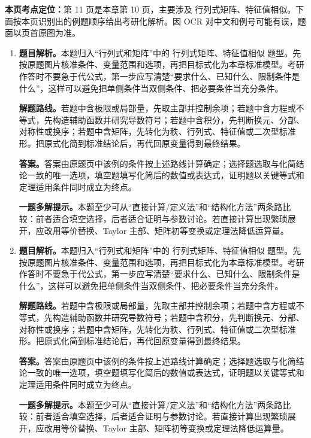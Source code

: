 \begin{solutionblock}
\textbf{本页考点定位：}第 11 页是本章第 10 页，主要涉及 行列式矩阵、特征值相似。下面按本页识别出的例题顺序给出考研化解析。因 OCR 对中文和例号可能有误，题面以页首原图为准。

\begin{enumerate}[label=\textbf{例\arabic*.}, leftmargin=2.4em]

\item \textbf{题目解析。}本题归入“行列式和矩阵”中的 行列式矩阵、特征值相似 题型。先按原题图片核准条件、变量范围和选项，再把目标式化为本章标准模型。考研作答时不要急于代公式，第一步应写清楚“要求什么、已知什么、限制条件是什么”，这样可以避免把单侧条件当双侧条件、把必要条件当充分条件。

\textbf{解题路线。}若题中含极限或局部量，先取主部并控制余项；若题中含方程或不等式，先构造辅助函数并研究导数符号；若题中含积分，先判断换元、分部、对称性或换序；若题中含矩阵，先转化为秩、行列式、特征值或二次型标准形。把原式化简到标准结论后，再代回原变量得到最终结果。

\textbf{答案。}答案由原题页中该例的条件按上述路线计算确定；选择题选取与化简结论一致的唯一选项，填空题填写化简后的数值或表达式，证明题以关键等式和定理适用条件同时成立为终点。

\textbf{一题多解提示。}本题至少可从“直接计算/定义法”和“结构化方法”两条路比较：前者适合填空选择，后者适合证明与参数讨论。若直接计算出现繁琐展开，应改用等价替换、Taylor 主部、矩阵初等变换或定理法降低运算量。

\item \textbf{题目解析。}本题归入“行列式和矩阵”中的 行列式矩阵、特征值相似 题型。先按原题图片核准条件、变量范围和选项，再把目标式化为本章标准模型。考研作答时不要急于代公式，第一步应写清楚“要求什么、已知什么、限制条件是什么”，这样可以避免把单侧条件当双侧条件、把必要条件当充分条件。

\textbf{解题路线。}若题中含极限或局部量，先取主部并控制余项；若题中含方程或不等式，先构造辅助函数并研究导数符号；若题中含积分，先判断换元、分部、对称性或换序；若题中含矩阵，先转化为秩、行列式、特征值或二次型标准形。把原式化简到标准结论后，再代回原变量得到最终结果。

\textbf{答案。}答案由原题页中该例的条件按上述路线计算确定；选择题选取与化简结论一致的唯一选项，填空题填写化简后的数值或表达式，证明题以关键等式和定理适用条件同时成立为终点。

\textbf{一题多解提示。}本题至少可从“直接计算/定义法”和“结构化方法”两条路比较：前者适合填空选择，后者适合证明与参数讨论。若直接计算出现繁琐展开，应改用等价替换、Taylor 主部、矩阵初等变换或定理法降低运算量。

\end{enumerate}
\end{solutionblock}



